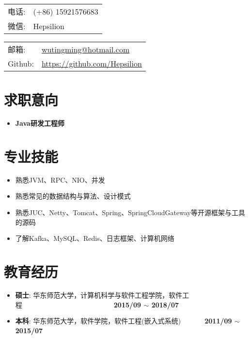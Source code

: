 \documentclass[letterpaper, UTF8, 11pt]{article}
\def\name{\textbf{\textcolor[rgb]{0.00, 0.00, 0.00}{\fontsize{30pt}{30pt}吴庭明}} ~~~~~~~~~ \fontsize{15pt}{15pt}}
\begin{document}
	
	\noindent{\bf \name} 
	\vspace{0.1in}

	\begin{minipage}{0.45\linewidth}
		\begin{tabular}{ll}
			电话:   & (+86) 15921576683 \\
			微信:   & Hepsilion \\
		\end{tabular}
	\end{minipage}
	\begin{minipage}{0.45\linewidth}
		\begin{tabular}{ll}
			邮箱:   & \href{mailto:wutingming@hotmail.com}{ wutingming@hotmail.com} \\
			Github: & \href{https://github.com/Hepsilion}{https://github.com/Hepsilion}\\
		\end{tabular}
	\end{minipage}
	\vspace{-0.1in}
	
	\section*{\textbf{求职意向}}\vspace{-0.12in}
	\begin{itemize}
		\item \textbf{Java研发工程师}
	\end{itemize}
	\vspace{-0.25in}
	
	\section*{\textbf{专业技能}}\vspace{-0.12in}
	\begin{itemize}
		\item 熟悉JVM、RPC、NIO、并发
		\item 熟悉常见的数据结构与算法、设计模式
		\item 熟悉JUC、Netty、Tomcat、Spring、SpringCloudGateway等开源框架与工具的源码
		\item 了解Kafka、MySQL、Redis、日志框架、计算机网络

	\end{itemize}
	\vspace{-0.32in}
	
	\section*{\textbf{教育经历}}\vspace{-0.12in}
	\begin{itemize}
		\item \textbf{硕士}: 华东师范大学，计算机科学与软件工程学院，软件工程~~~~~~~~~~~~~~~~~~~~~~~~~~~\textbf{2015/09 $\sim$ 2018/07}
		\item \textbf{本科}: 华东师范大学，软件学院，软件工程(嵌入式系统)~~~~~~~\textbf{2011/09 $\sim$ 2015/07}
	\end{itemize}
	\vspace{-0.32in}
	
\end{document}
